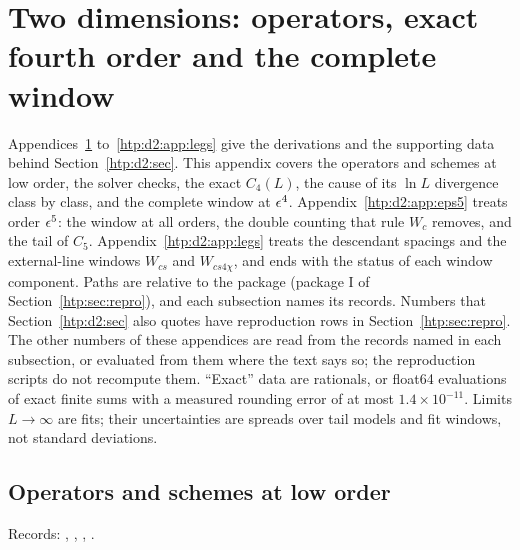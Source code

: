 \section{Two dimensions: operators, exact fourth order and the complete window}\label{htp:d2:app:eps4}

Appendices~\ref{htp:d2:app:eps4} to~\ref{htp:d2:app:legs} give the derivations and the supporting data behind
Section~\ref{htp:d2:sec}. This appendix covers the operators and schemes at low order, the solver checks, the exact $C_4(L)$,
the cause of its $\ln L$ divergence class by class, and the complete window at $\epsilon^4$. Appendix~\ref{htp:d2:app:eps5}
treats order $\epsilon^5$: the window at all orders, the double counting that rule $W_c$ removes, and the tail of $C_5$.
Appendix~\ref{htp:d2:app:legs} treats the descendant spacings and the external-line windows $W_{cs}$ and $W_{cs4\chi}$, and
ends with the status of each window component. Paths are relative to the package
 (package I of Section~\ref{htp:sec:repro}), and each subsection names its
records. Numbers that Section~\ref{htp:d2:sec} also quotes have reproduction rows in Section~\ref{htp:sec:repro}. The other numbers
of these appendices are read from the records named in each subsection, or evaluated from them where the text says
so; the reproduction scripts do not recompute them. ``Exact'' data
are rationals, or float64 evaluations of exact finite sums with a measured rounding error of at most
$1.4\times10^{-11}$. Limits $L\to\infty$ are fits; their uncertainties are spreads over tail models and fit windows, not
standard deviations.

\subsection{Operators and schemes at low order}\label{htp:d2:app:ops}
{\small\raggedright\noindent Records: , , ,
.\par}

